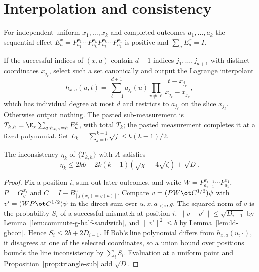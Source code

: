 \section{Interpolation and consistency}
\label{sec:ld-sandwiching}

For independent uniform $x_1,\ldots,x_k$ and completed outcomes
$a_1,\ldots,a_k$ the sequential effect
$E^x_a=P^{x_1}_{a_1}\cdots P^{x_k}_{a_k}P^{x_k}_{a_k}\cdots P^{x_1}_{a_1}$
is positive and $\sum_aE^x_a=I$.

\begin{definition}\label{def:first-success-pasting}
	\leanok
	If the successful indices of $(x,a)$ contain $d+1$ indices
	$j_1,\ldots,j_{d+1}$ with distinct coordinates $x_{j_\ell}$, select such a
	set canonically and output the Lagrange interpolant
	\[
		h_{x,a}(u,t)=\sum_{\ell=1}^{d+1}a_{j_\ell}(u)
		\prod_{v\ne\ell}\frac{t-x_{j_v}}{x_{j_\ell}-x_{j_v}},
	\]
	which has individual degree at most $d$ and restricts to $a_{j_\ell}$ on
	the slice $x_{j_\ell}$.  Otherwise output nothing.  The pasted
	sub-measurement is $T_{k,h}=\E_x\sum_{a:h_{x,a}=h}E^x_a$, with total
	$T_k$; the pasted measurement completes it at a fixed polynomial.  Set
	$L_k=\sum_{j=0}^{k-1}\sqrt j\le k(k-1)/2$.
\end{definition}

\begin{lemma}[Consistency]\label{lem:pasting-consistency}
	\leanok
	The inconsistency $\eta_k$ of $\{T_{k,h}\}$ with $A$ satisfies
	\[
		\eta_k\le2kb+2k(k-1)(\sqrt\chi+4\sqrt\zeta)+\sqrt D.
	\]
\end{lemma}
\begin{proof}
	\leanok
	Fix a position $i$, sum out later outcomes, and write
	$W=P^{x_{i-1}}_{a_{i-1}}\cdots P^{x_1}_{a_1}$, $P=G^{x_i}_g$ and
	$C=I-B^u_{[f(x_i)=g(u)]}$.  Compare $v=(PW\ot C^{1/2})\psi$ with
	$v'=(WP\ot C^{1/2})\psi$ in the direct sum over $u,x,a_{<i},g$.  The
	squared norm of $v$ is the probability $S_i$ of a successful mismatch at
	position $i$, $\|v-v'\|\le\sqrt{D_{i-1}}$ by
	Lemma~\ref{lem:commute-g-half-sandwich}, and $\|v'\|^2\le b$ by
	Lemma~\ref{lem:ld-gbcon}.  Hence $S_i\le2b+2D_{i-1}$.  If Bob's line
	polynomial differs from $h_{x,a}(u,\cdot)$, it disagrees at one of the
	selected coordinates, so a union bound over positions bounds the line
	inconsistency by $\sum_iS_i$.  Evaluation at a uniform point and
	Proposition~\ref{prop:triangle-sub} add $\sqrt D$.
\end{proof}

